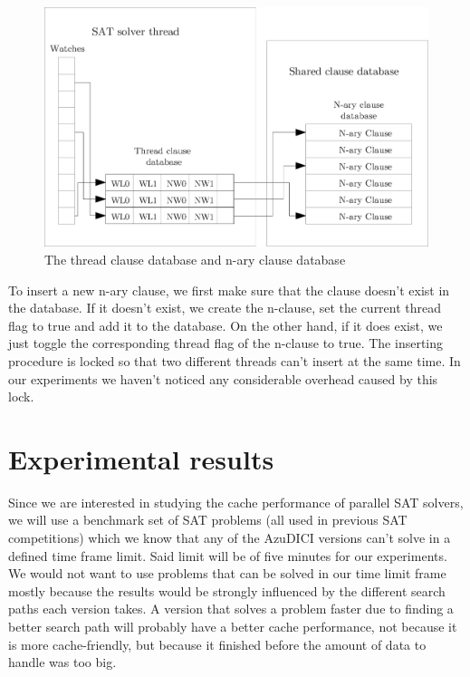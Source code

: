 \documentclass[12pt]{diicc}
\begin{document}
\begin{figure}[tp]
  \centering
  \includegraphics[scale=0.6]{AzuDICI_design}
  \caption{The thread clause database and n-ary clause database}
  \label{fig:azu design}
\end{figure}

To insert a new n-ary clause, we first make sure that the clause 
doesn't exist in the database. If it 
doesn't exist, we create the n-clause, set the current thread 
flag to true and add it to the database. 
On the other hand, if it does exist, we just toggle the 
corresponding thread flag of the n-clause to true. The inserting 
procedure is locked so that two different threads can't insert
at the same time. In our experiments we haven't noticed any 
considerable overhead caused by this lock.


\section{Experimental results} 

Since we are interested in studying the cache performance of parallel SAT solvers, we will use a benchmark set of SAT problems (all used in previous SAT competitions) which we know that any of the AzuDICI versions can't solve in a defined time frame limit. Said limit will be of five minutes for our experiments. We would not want to use problems that can be solved in our time limit frame mostly because the results would be strongly influenced by the different search paths each version takes. A version that solves a problem faster due to finding a better search path will probably have a better cache performance, not because it is more cache-friendly, but because it finished before the amount of data to handle was too big.
\end{document}
